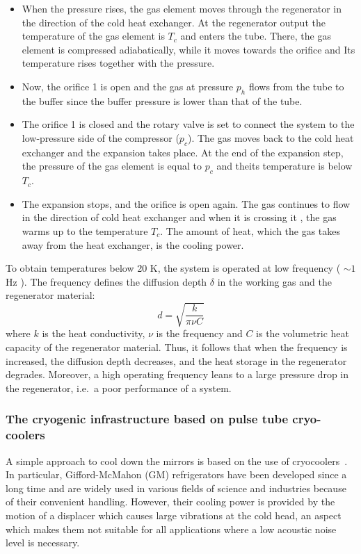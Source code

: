 {\begin{itemize}
\item{When the pressure rises, the gas element moves through the regenerator in the direction of the cold heat exchanger. At the regenerator output  the temperature of the gas element is $T_c$ and enters the tube. There, the gas element is compressed adiabatically, while it moves towards the orifice and  Its temperature rises together with the pressure.}
\item{Now, the orifice 1 is open and  the gas  at pressure $p_h$ flows from the tube to the buffer since  the buffer pressure is lower than that of the tube.}
\item{ The orifice 1 is closed and the rotary valve is set to connect the system to the low-pressure side of the compressor ($p_c$). The gas moves back to the cold heat exchanger and the expansion takes place.  At the end of the expansion step, the pressure of the gas element is equal to $p_c$  and theits temperature is below $T_c$.}
\item{The expansion stops, and the orifice is open again. The gas continues to flow in the direction of  cold heat exchanger and when it is crossing it , the gas warms up to the temperature $T_c$. The amount of heat, which the gas takes away from the heat exchanger, is the cooling power.}
\end{itemize}
To obtain temperatures below 20 K, the system is  operated at low frequency ( $\sim 1$ Hz ).
The frequency defines the diffusion depth $\delta$ in the working gas and the regenerator material:
$$d = \sqrt{\frac {k}{\pi \nu C}}$$
\noindent where $k$ is the heat conductivity, $\nu$ is the frequency and $C$ is the volumetric heat capacity of the regenerator material. Thus, it follows that when the frequency is increased, the diffusion depth decreases, and the heat storage in the regenerator degrades.
Moreover, a high operating frequency leans to a large pressure drop in the regenerator, i.e.\ a poor performance of a system.}
\FloatBarrier
 \subsubsection{The cryogenic infrastructure based on pulse tube cryo-coolers}
 \label{sec:cryocoolers}

A simple approach to cool down the mirrors  is based on the use of cryocoolers~\cite{LCGT}. In particular,  
Gifford-McMahon (GM) refrigerators have been developed since a long time and are widely used in various fields of science and industries because of their convenient handling. 
However, their cooling power  is provided by the motion of a displacer which causes large vibrations at the cold head, an aspect which makes them not suitable for all applications where a low acoustic noise level is necessary.

